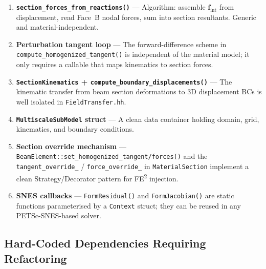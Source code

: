 \begin{enumerate}
  \item \textbf{\texttt{section\_forces\_from\_reactions()}} ---
    Algorithm: assemble $\mathbf{f}_{\mathrm{int}}$ from
    displacement, read Face~B nodal forces, sum into section
    resultants.  Generic and material-independent.

  \item \textbf{Perturbation tangent loop} --- The forward-difference
    scheme in \texttt{compute\_homogenized\_tangent()} is independent
    of the material model; it only requires a callable that maps
    kinematics to section forces.

  \item \textbf{\texttt{SectionKinematics} +
    \texttt{compute\_boundary\_displacements()}} --- The kinematic
    transfer from beam section deformations to 3D displacement BCs
    is well isolated in \texttt{FieldTransfer.hh}.

  \item \textbf{\texttt{MultiscaleSubModel} struct} --- A clean
    data container holding domain, grid, kinematics, and boundary
    conditions.

  \item \textbf{Section override mechanism} ---
    \texttt{BeamElement::set\_homogenized\_tangent/forces()} and
    the \texttt{tangent\_override\_} / \texttt{force\_override\_} in
    \texttt{MaterialSection} implement a clean Strategy/Decorator
    pattern for FE\textsuperscript{2} injection.

  \item \textbf{SNES callbacks} ---
    \texttt{FormResidual()} and \texttt{FormJacobian()} are
    static functions parameterised by a \texttt{Context} struct;
    they can be reused in any PETSc-SNES-based solver.
\end{enumerate}

\subsection{Hard-Coded Dependencies Requiring Refactoring}

